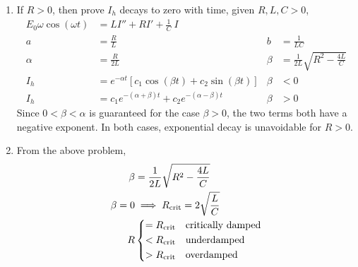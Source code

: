 \begin{enumerate}
    \item If $ R > 0 $, then prove $ I_{h} $ decays to zero with time, given
          $ R, L, C > 0 $,
          \begin{align}
              E_{0}\omega\cos(\omega t)     & = LI'' + RI' + \frac{1}{C}\ I        \\
              a                             & = \frac{R}{L}                      &
              b                             & = \frac{1}{LC}                       \\
              \alpha                        & = \frac{R}{2L}                     &
              \beta                         & = \frac{1}{2L}\sqrt{R^{2}
              - \frac{4L}{C}}                                                      \\
              I_{h}                         & = e^{-\alpha t}[c_{1}\cos(\beta t)
              + c_{2}\sin(\beta t)]         &
              \beta                         & < 0                                  \\
              I_{h}                         & = c_{1}e^{-(\alpha + \beta)t}
              + c_{2}e^{-(\alpha - \beta)t} &
              \beta                         & > 0
          \end{align}
          Since $ 0 < \beta < \alpha $ is guaranteed for the case $ \beta > 0 $, the two
          terms both have a negative exponent. In both cases, exponential decay is
          unavoidable for $ R > 0 $.

    \item From the above problem,
          \begin{align}
              \beta     & = \frac{1}{2L} \sqrt{R^{2} - \frac{4L}{C}}               \\
              \beta = 0 & \implies R_{\text{crit}} = 2\sqrt{\frac{L}{C}}           \\
              R         & \begin{dcases}
                              = R_{\text{crit}} & \text{critically damped} \\
                              < R_{\text{crit}} & \text{underdamped}       \\
                              > R_{\text{crit}} & \text{overdamped}        \\
                          \end{dcases}
          \end{align}


\end{enumerate}
